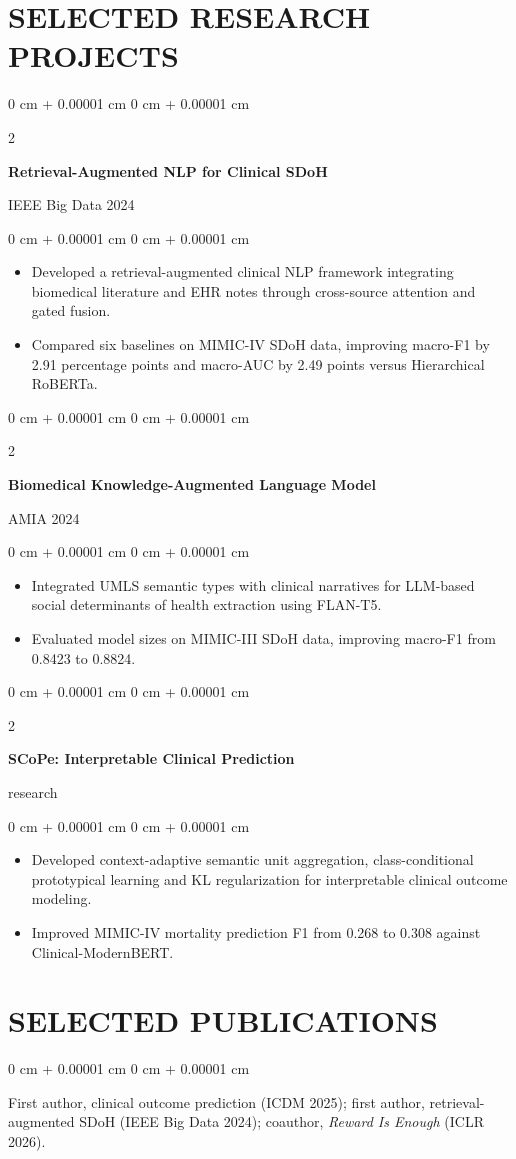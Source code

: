\documentclass[10pt, letterpaper]{article}
\newenvironment{highlights}{
    \begin{itemize}[
        topsep=0.03 cm,
        parsep=0.03 cm,
        partopsep=0pt,
        itemsep=0pt,
        leftmargin=0 cm + 10pt
    ]
}{
    \end{itemize}
} %
\newenvironment{onecolentry}{
    \begin{adjustwidth}{
        0 cm + 0.00001 cm
    }{
        0 cm + 0.00001 cm
    }
}{
    \end{adjustwidth}
} %
\newenvironment{twocolentry}[2][]{
    \onecolentry
    \def\secondColumn{#2}
    \setcolumnwidth{\fill, 4.5 cm}
    \begin{paracol}{2}
}{
    \switchcolumn \raggedleft \secondColumn
    \end{paracol}
    \endonecolentry
} %
\begin{document}
\section{SELECTED RESEARCH PROJECTS}
\begin{twocolentry}{IEEE Big Data 2024}
\textbf{Retrieval-Augmented NLP for Clinical SDoH}
\end{twocolentry}
\begin{onecolentry}
\begin{highlights}
\item Developed a retrieval-augmented clinical NLP framework integrating biomedical literature and EHR notes through cross-source attention and gated fusion.
\item Compared six baselines on MIMIC-IV SDoH data, improving macro-F1 by 2.91 percentage points and macro-AUC by 2.49 points versus Hierarchical RoBERTa.
\end{highlights}
\end{onecolentry}
\vspace{0.03 cm}
\begin{twocolentry}{AMIA 2024}
\textbf{Biomedical Knowledge-Augmented Language Model}
\end{twocolentry}
\begin{onecolentry}
\begin{highlights}
\item Integrated UMLS semantic types with clinical narratives for LLM-based social determinants of health extraction using FLAN-T5.
\item Evaluated model sizes on MIMIC-III SDoH data, improving macro-F1 from 0.8423 to 0.8824.
\end{highlights}
\end{onecolentry}
\vspace{0.03 cm}
\begin{twocolentry}{2026 research}
\textbf{SCoPe: Interpretable Clinical Prediction}
\end{twocolentry}
\begin{onecolentry}
\begin{highlights}
\item Developed context-adaptive semantic unit aggregation, class-conditional prototypical learning and KL regularization for interpretable clinical outcome modeling.
\item Improved MIMIC-IV mortality prediction F1 from 0.268 to 0.308 against Clinical-ModernBERT.
\end{highlights}
\end{onecolentry}
\vspace{0.03 cm}
\section{SELECTED PUBLICATIONS}
\begin{onecolentry}
First author, clinical outcome prediction (ICDM 2025); first author, retrieval-augmented SDoH (IEEE Big Data 2024); coauthor, \textit{Reward Is Enough} (ICLR 2026).
\end{onecolentry}
\end{document}
